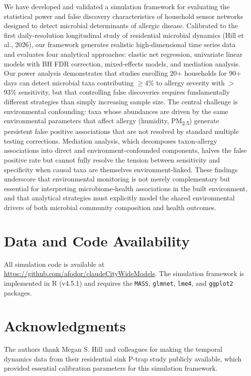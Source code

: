 \documentclass[11pt,letterpaper]{article}
\begin{document}
We have developed and validated a simulation framework for evaluating the statistical power and false discovery characteristics of household sensor networks designed to detect microbial determinants of allergic disease. Calibrated to the first daily-resolution longitudinal study of residential microbial dynamics (Hill et al., 2026), our framework generates realistic high-dimensional time series data and evaluates four analytical approaches: elastic net regression, univariate linear models with BH FDR correction, mixed-effects models, and mediation analysis. Our power analysis demonstrates that studies enrolling 20+ households for 90+ days can detect microbial taxa contributing $\geq$4\% to allergy severity with $>$93\% sensitivity, but that controlling false discoveries requires fundamentally different strategies than simply increasing sample size. The central challenge is environmental confounding: taxa whose abundances are driven by the same environmental parameters that affect allergy (humidity, PM\textsubscript{2.5}) generate persistent false positive associations that are not resolved by standard multiple testing corrections. Mediation analysis, which decomposes taxon-allergy associations into direct and environment-confounded components, halves the false positive rate but cannot fully resolve the tension between sensitivity and specificity when causal taxa are themselves environment-linked. These findings underscore that environmental monitoring is not merely complementary but essential for interpreting microbiome-health associations in the built environment, and that analytical strategies must explicitly model the shared environmental drivers of both microbial community composition and health outcomes.

\section*{Data and Code Availability}

All simulation code is available at \url{https://github.com/afodor/claudeCityWideModels}. The simulation framework is implemented in R (v4.5.1) and requires the \texttt{MASS}, \texttt{glmnet}, \texttt{lme4}, and \texttt{ggplot2} packages.

\section*{Acknowledgments}

The authors thank Megan S. Hill and colleagues for making the temporal dynamics data from their residential sink P-trap study publicly available, which provided essential calibration parameters for this simulation framework.
\end{document}

